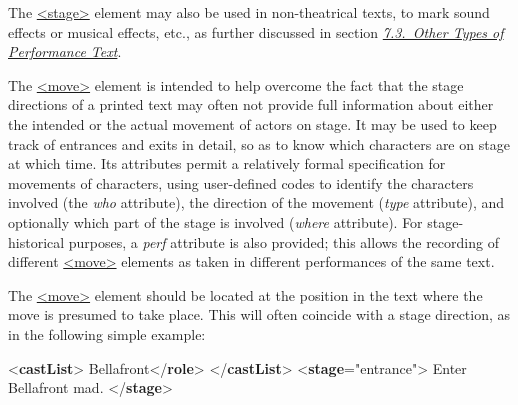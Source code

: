 The \hyperref[TEI.stage]{<stage>} element may also be used in non-theatrical texts, to mark sound effects or musical effects, etc., as further discussed in section \textit{\hyperref[DROTH]{7.3.\ Other Types of Performance Text}}.\par
The \hyperref[TEI.move]{<move>} element is intended to help overcome the fact that the stage directions of a printed text may often not provide full information about either the intended or the actual movement of actors on stage. It may be used to keep track of entrances and exits in detail, so as to know which characters are on stage at which time. Its attributes permit a relatively formal specification for movements of characters, using user-defined codes to identify the characters involved (the {\itshape who} attribute), the direction of the movement ({\itshape type} attribute), and optionally which part of the stage is involved ({\itshape where} attribute). For stage-historical purposes, a {\itshape perf} attribute is also provided; this allows the recording of different \hyperref[TEI.move]{<move>} elements as taken in different performances of the same text.\par
The \hyperref[TEI.move]{<move>} element should be located at the position in the text where the move is presumed to take place. This will often coincide with a stage direction, as in the following simple example: \par\bgroup{}\exampleFont \begin{shaded}\noindent\mbox{}{<\textbf{castList}>}\mbox{}\newline 
{}\mbox{}\newline 
\hspace*{1em}Bellafront{</\textbf{role}>}\mbox{}\newline 
{}\mbox{}\newline 
{</\textbf{castList}>}\mbox{}\newline 
{<\textbf{stage}\hspace*{1em}{type}="{entrance}">}\mbox{}\newline 
{}\mbox{}\newline 
 Enter Bellafront mad.\mbox{}\newline 
{</\textbf{stage}>}\end{shaded}\egroup\par \par

